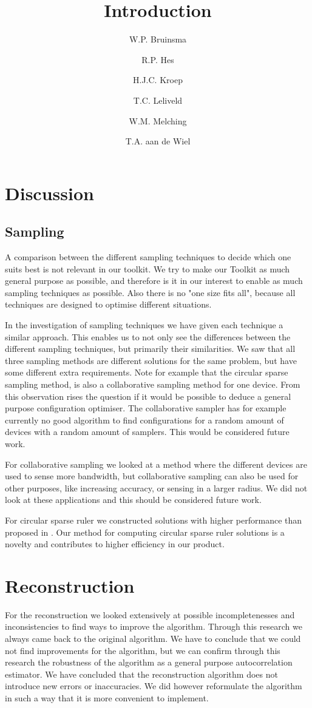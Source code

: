 \documentclass[a4paper, openany, oneside]{memoir}
\title{Introduction}
\author{W.P. Bruinsma \and R.P. Hes \and H.J.C. Kroep \and T.C. Leliveld \and W.M. Melching \and T.A. aan de Wiel}
\begin{document}
\section{Discussion}

\subsection{Sampling}
A comparison between the different sampling techniques to decide which one suits best is not relevant in our toolkit. We try to make our Toolkit as much general purpose as possible, and therefore is it in our interest to enable as much sampling techniques as possible. Also there is no "one size fits all", because all techniques are designed to optimise different situations.

In the investigation of sampling techniques we have given each technique a similar approach. This enables us to not only see the differences between the different sampling techniques, but primarily their similarities. We saw that all three sampling methods are different solutions for the same problem, but have some different extra requirements. Note for example that the circular sparse sampling method, is also a collaborative sampling method for one device. From this observation rises the question if it would be possible to deduce a  general purpose configuration optimiser. The collaborative sampler has for example currently no good algorithm to find configurations for a random amount of devices with a random amount of samplers. This would be considered future work.  

For collaborative sampling we looked at a method where the different devices are used to sense more bandwidth, but collaborative sampling can also be used for other purposes, like increasing accuracy, or sensing in a larger radius. We did not look at these applications and this should be considered future work.

For circular sparse ruler we constructed solutions with higher performance than proposed in \cite{ariananda2012compressive}. Our method for computing circular sparse ruler solutions is a novelty and contributes to higher efficiency in our product.

\section{Reconstruction}
For the reconstruction we looked extensively at possible incompletenesses and inconsistencies to find ways to improve the algorithm. Through this research we always came back to the original algorithm. We have to conclude that we could not find improvements for the algorithm, but we can confirm through this research the robustness of the algorithm as a general purpose autocorrelation estimator. We have concluded that the reconstruction algorithm does not introduce new errors or inaccuracies. We did however reformulate the algorithm in such a way that it is more convenient to implement.
\end{document}

